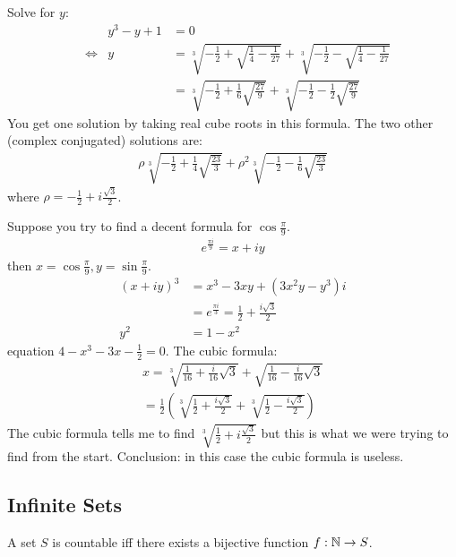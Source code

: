 \begin{nex}
	\item
	Solve for $y$:
	\begin{align*}
	& & y^3-y+1 & = 0 \\
	& \Leftrightarrow & y & = \sqrt[3]{-\frac 1 2 + \sqrt{\frac 1 4 - \frac 1 {27}}} + \sqrt[3]{-\frac 1 2 - \sqrt{\frac 1 4 - \frac 1 {27}}} \\
	& & & = \sqrt[3]{-\frac 1 2 + \frac 1 6 \sqrt{\frac{27} 9}} + \sqrt[3]{-\frac 1 2 - \frac 1 2 \sqrt{\frac{27} 9 }} 
	\end{align*}
	You get one solution by taking real cube roots in this formula. The two other (complex conjugated) solutions are:
	\begin{align*}
	\rho \sqrt[3]{-\frac 1 2 + \frac 1 4 \sqrt{\frac{23} 3 }} + \rho^2 \sqrt[3]{- \frac 1 2 - \frac 1 6 \sqrt{ \frac{23} 3}} 
	\end{align*}
	where $\rho = -\frac 1 2 + i \frac{\sqrt 3} 2$.
	\item
	Suppose you try to find a decent formula for $\cos \frac \pi 9$.
	\begin{align*}
	e^{\frac{\pi i}{9}} = x + iy
	\end{align*}
	then $x = \cos \frac \pi 9, y = \sin \frac \pi 9$. 
	\begin{align*}
	(x+iy)^3 & = x^3 - 3xy + (3x^2y-y^3)i \\
	& = e^{\frac{\pi i} 3} = \frac 1 2 + \frac{i \sqrt 3}{2} \\
	y^2 & = 1-x^2
	\end{align*}
	equation $4-x^3 -3x - \frac 1 2 =0$. The cubic formula:
	\begin{align*}
	x = \sqrt[3]{\frac 1 {16} + \frac{i}{16} \sqrt 3 } + \sqrt{\frac 1 {16} - \frac i {16} \sqrt 3} \\
	= \frac 1 2 \left(\sqrt[3]{\frac 1 2 + \frac{i \sqrt 3} 2} + \sqrt[3]{\frac 1 2 - \frac{i\sqrt 3} 2} \right) 
	\end{align*}
	The cubic formula tells me to find $\sqrt[3]{\frac 1 2 + i \frac{\sqrt 3} 2}$ but this is what we were trying to find from the start. Conclusion: in this case the cubic formula is useless.
\end{nex}

\subsection{Infinite Sets}

\begin{df}
	A set $S$ is countable iff there exists a bijective function $f: \mathbb N \to S$.
\end{df}


